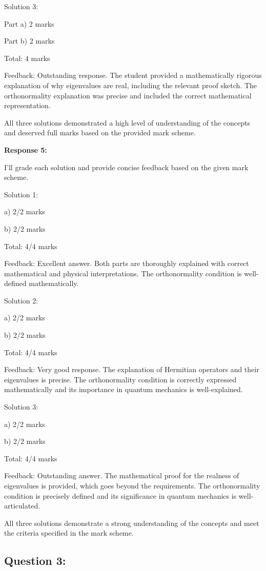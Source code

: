 \documentclass[a4paper,11pt]{article}
\begin{document}
Solution 3:

Part a) 2 marks

Part b) 2 marks

Total: 4 marks

Feedback: Outstanding response. The student provided a mathematically rigorous explanation of why eigenvalues are real, including the relevant proof sketch. The orthonormality explanation was precise and included the correct mathematical representation.

All three solutions demonstrated a high level of understanding of the concepts and deserved full marks based on the provided mark scheme.

\bigskip
\textbf{Response 5:}

I'll grade each solution and provide concise feedback based on the given mark scheme.

Solution 1:

a) 2/2 marks

b) 2/2 marks

Total: 4/4 marks

Feedback: Excellent answer. Both parts are thoroughly explained with correct mathematical and physical interpretations. The orthonormality condition is well-defined mathematically.

Solution 2:

a) 2/2 marks

b) 2/2 marks

Total: 4/4 marks

Feedback: Very good response. The explanation of Hermitian operators and their eigenvalues is precise. The orthonormality condition is correctly expressed mathematically and its importance in quantum mechanics is well-explained.

Solution 3:

a) 2/2 marks

b) 2/2 marks

Total: 4/4 marks

Feedback: Outstanding answer. The mathematical proof for the realness of eigenvalues is provided, which goes beyond the requirements. The orthonormality condition is precisely defined and its significance in quantum mechanics is well-articulated.

All three solutions demonstrate a strong understanding of the concepts and meet the criteria specified in the mark scheme.

\subsection*{Question 3:}
\end{document}
